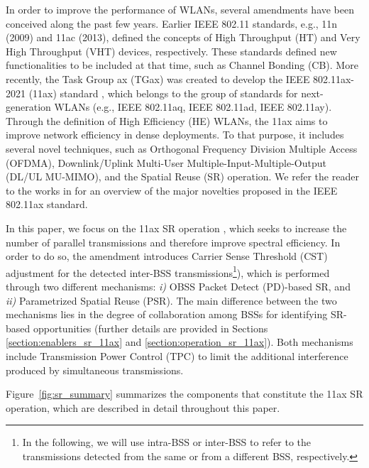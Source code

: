 \documentclass{article}
\begin{document}
In order to improve the performance of WLANs, several amendments have been conceived along the past few years. Earlier IEEE 802.11 standards, e.g., 11n (2009) and 11ac (2013), defined the concepts of High Throughput (HT) and Very High Throughput (VHT) devices, respectively. These standards defined new functionalities to be included at that time, such as Channel Bonding (CB). More recently, the Task Group ax (TGax) was created to develop the IEEE 802.11ax-2021 (11ax) standard \cite{tgax2019draft}, which belongs to the group of standards for next-generation WLANs (e.g., IEEE 802.11aq, IEEE 802.11ad, IEEE 802.11ay). Through the definition of High Efficiency (HE) WLANs, the 11ax aims to improve network efficiency in dense deployments. To that purpose, it includes several novel techniques, such as Orthogonal Frequency Division Multiple Access (OFDMA), Downlink/Uplink Multi-User Multiple-Input-Multiple-Output (DL/UL MU-MIMO), and the Spatial Reuse (SR) operation. We refer the reader to the works in \cite{bellalta2016ieee, afaqui2016ieee, qu2018survey, khorov2018tutorial} for an overview of the major novelties proposed in the IEEE 802.11ax standard.

In this paper, we focus on the 11ax SR operation \cite{merlin2009methods}, which seeks to increase the number of parallel transmissions and therefore improve spectral efficiency. In order to do so, the amendment introduces Carrier Sense Threshold (CST) adjustment for the detected inter-BSS transmissions\footnote{In the following, we will use intra-BSS or inter-BSS to refer to the transmissions detected from the same or from a different BSS, respectively.}), which is performed through two different mechanisms: \emph{i)} OBSS Packet Detect (PD)-based SR, and \emph{ii)} Parametrized Spatial Reuse (PSR). The main difference between the two mechanisms lies in the degree of collaboration among BSSs for identifying SR-based opportunities (further details are provided in Sections \ref{section:enablers_sr_11ax} and \ref{section:operation_sr_11ax}). Both mechanisms include Transmission Power Control (TPC) to limit the additional interference produced by simultaneous transmissions. 

Figure~\ref{fig:sr_summary} summarizes the components that constitute the 11ax SR operation, which are described in detail throughout this paper.
\end{document}
